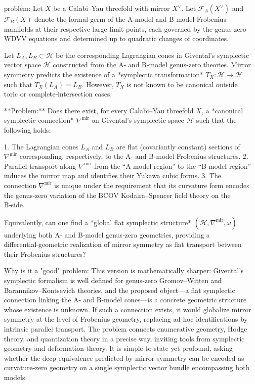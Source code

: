 problem:  
Let \(X\) be a Calabi–Yau threefold with mirror \(X^\vee\).  Let \(\mathcal{F}_A(X^\vee)\) and \(\mathcal{F}_B(X)\) denote the formal germ of the A‑model and B‑model Frobenius manifolds at their respective large limit points, each governed by the genus‑zero WDVV equations and determined up to quadratic changes of coordinates.  

Let \(L_A, L_B \subset \mathcal{H}\) be the corresponding Lagrangian cones in Givental’s symplectic vector space \(\mathcal{H}\) constructed from the A‑ and B‑model genus‑zero theories. Mirror symmetry predicts the existence of a *symplectic transformation* \(T_X:\mathcal{H}\to\mathcal{H}\) such that \(T_X(L_A)=L_B\).  However, \(T_X\) is not known to be canonical outside toric or complete‑intersection cases.  

**Problem:**  
Does there exist, for every Calabi–Yau threefold \(X\), a *canonical symplectic connection* \(\nabla^{\mathrm{mir}}\) on Givental’s symplectic space \(\mathcal{H}\) such that the following holds:

1. The Lagrangian cones \(L_A\) and \(L_B\) are flat (covariantly constant) sections of \(\nabla^{\mathrm{mir}}\) corresponding, respectively, to the A‑ and B‑model Frobenius structures.  
2. Parallel transport along \(\nabla^{\mathrm{mir}}\) from the “A‑model region” to the “B‑model region” induces the mirror map and identifies their Yukawa cubic forms.  
3. The connection \(\nabla^{\mathrm{mir}}\) is unique under the requirement that its curvature form encodes the genus‑zero variation of the BCOV Kodaira–Spencer field theory on the B‑side.

Equivalently, can one find a *global flat symplectic structure* \((\mathcal{H},\nabla^{\mathrm{mir}},\omega)\) underlying both A‑ and B‑model genus‑zero geometries, providing a differential‑geometric realization of mirror symmetry as flat transport between their Frobenius structures?

Why is it a "good" problem:  
This version is mathematically sharper: Givental’s symplectic formalism is well defined for genus‑zero Gromov–Witten and Barannikov–Kontsevich theories, and the proposed object—a flat symplectic connection linking the A‑ and B‑model cones—is a concrete geometric structure whose existence is unknown.  If such a connection exists, it would globalize mirror symmetry at the level of Frobenius geometry, replacing ad hoc identifications by intrinsic parallel transport.  The problem connects enumerative geometry, Hodge theory, and quantization theory in a precise way, inviting tools from symplectic geometry and deformation theory.  It is simple to state yet profound, asking whether the deep equivalence predicted by mirror symmetry can be encoded as curvature‑zero geometry on a single symplectic vector bundle encompassing both models.